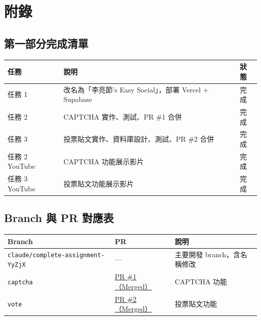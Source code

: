 \documentclass[12pt, a4paper]{article}
\begin{document}
\newpage
\section*{附錄}

\subsection*{第一部分完成清單}

\begin{table}[H]
\centering
\begin{tabularx}{\textwidth}{lXl}
\toprule
\textbf{任務} & \textbf{說明} & \textbf{狀態} \\
\midrule
任務 1 & 改名為「李亮節's Easy Social」，部署 Vercel + Supabase & \textcolor{green!60!black}{完成} \\
任務 2 & CAPTCHA 實作、測試、PR \#1 合併 & \textcolor{green!60!black}{完成} \\
任務 3 & 投票貼文實作、資料庫設計、測試、PR \#2 合併 & \textcolor{green!60!black}{完成} \\
任務 2 YouTube & CAPTCHA 功能展示影片 & \textcolor{green!60!black}{完成} \\
任務 3 YouTube & 投票貼文功能展示影片 & \textcolor{green!60!black}{完成} \\
\bottomrule
\end{tabularx}
\end{table}

\subsection*{Branch 與 PR 對應表}

\begin{table}[H]
\centering
\begin{tabularx}{\textwidth}{llX}
\toprule
\textbf{Branch} & \textbf{PR} & \textbf{說明} \\
\midrule
\texttt{claude/complete-assignment-YyZjX} & --- & 主要開發 branch，含名稱修改 \\
\texttt{captcha} & \href{https://github.com/nia1003/easy-social/pull/1}{PR \#1（Merged）} & CAPTCHA 功能 \\
\texttt{vote} & \href{https://github.com/nia1003/easy-social/pull/2}{PR \#2（Merged）} & 投票貼文功能 \\
\bottomrule
\end{tabularx}
\end{table}
\end{document}
